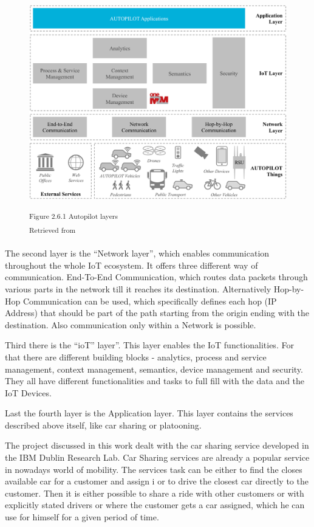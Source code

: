 \begin{figure}[h]
\centering
\includegraphics[width=\textwidth/5*4]{images/autopilot_layers.png}

\textsuperscript{Figure 2.6.1 Autopilot layers}\\
\textsuperscript{Retrieved from \cite{}}
\end{figure}

The second layer is the ``Network layer'', which enables communication throughout the whole IoT ecosystem. It offers three different way of communication. End-To-End Communication, which routes data packets through various parts in the network till it reaches its destination. Alternatively Hop-by-Hop Communication can be used, which specifically defines each hop (IP Address) that should be part of the path starting from the origin ending with the destination. Also communication only within a Network is possible.

Third there is the ``ioT'' layer''. This layer enables the IoT functionalities. For that there are different building blocks - analytics, process and service management, context management, semantics, device management and security. They all have different functionalities and tasks to full fill with the data and the IoT Devices.

Last the fourth layer is the Application layer. This layer contains the services described above itself, like car sharing or platooning.


The project discussed in this work dealt with the car sharing service developed in the IBM Dublin Research Lab. Car Sharing services are already a popular service in nowadays world of mobility. The services task can be either to find the closes available car for a customer and assign i or to drive the closest car directly to the customer. Then it is either possible to share a ride with other customers or with explicitly stated drivers or where the customer gets a car assigned, which he can use for himself for a given period of time.

